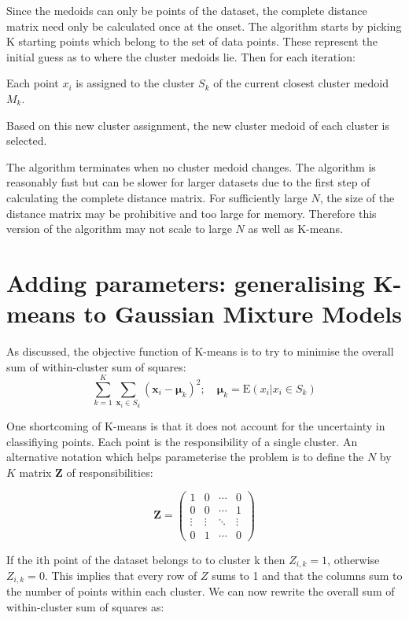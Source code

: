 Since the medoids can only be points of the dataset, the complete distance matrix need only be calculated once at the onset.
The algorithm starts by picking K starting points which belong to the set of data points.
These represent the initial guess as to where the cluster medoids lie.
Then for each iteration:
\begin{itemise}
    \item Each point $x_i$ is assigned to the cluster $S_k$ of the current closest cluster medoid $M_k$.
    \item Based on this new cluster assignment, the new cluster medoid of each cluster is selected.
\end{itemise}
The algorithm terminates when no cluster medoid changes.
The algorithm is reasonably fast but can be slower for larger datasets due to the first step of calculating the complete distance matrix.
For sufficiently large $N$, the size of the distance matrix may be prohibitive and too large for memory.
Therefore this version of the algorithm may not scale to large $N$ as well as K-means. 



\section{Adding parameters: generalising K-means to Gaussian Mixture Models}

As discussed, the objective function of K-means is to try to minimise the overall sum of within-cluster sum of squares:
\[
    \sum_{k=1}^{K} \sum_{\mathbf x_i \in S_k} ( \mathbf x_i - \boldsymbol\mu_k )^2 ; \quad \boldsymbol\mu_k=\text{E}(x_i| x_i \in S_k)
\]

One shortcoming of K-means is that it does not account for the uncertainty in classifiying points.
Each point is the responsibility of a single cluster.
An alternative notation which helps parameterise the problem is to define the $N$ by $K$ matrix $\mathbf Z$ of responsibilities:

\[
\mathbf Z =
 \begin{pmatrix}
  1 & 0 & \cdots & 0 \\
  0 & 0 & \cdots & 1 \\
  \vdots  & \vdots  & \ddots & \vdots  \\
  0 & 1 & \cdots & 0
 \end{pmatrix}
\]

If the ith point of the dataset belongs to to cluster k then $Z_{i,k}=1$, otherwise $Z_{i,k}=0$.
This implies that every row of $Z$ sums to 1 and that the columns sum to the number of points within each cluster.
We can now rewrite the overall sum of within-cluster sum of squares as:

